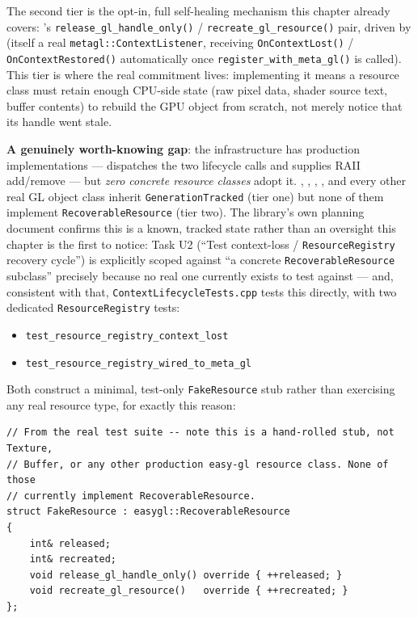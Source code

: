 The second tier is the opt-in, full self-healing mechanism this chapter already covers:
's \texttt{release\_gl\_handle\_only()} / \texttt{recreate\_gl\_resource()}
pair, driven by  (itself a real \texttt{metagl::ContextListener},
receiving \texttt{OnContextLost()} / \texttt{OnContextRestored()} automatically once
\texttt{register\_with\_meta\_gl()} is called). This tier is where the real commitment lives:
implementing it means a resource class must retain enough CPU-side state (raw pixel data, shader
source text, buffer contents) to rebuild the GPU object from scratch, not merely notice that its
handle went stale.

\textbf{A genuinely worth-knowing gap}: the infrastructure has production implementations ---
 dispatches the two lifecycle calls and
 supplies RAII add/remove --- but \emph{zero concrete resource
classes} adopt it. , , ,
, and every other real GL object class inherit \texttt{GenerationTracked}
(tier one) but none of them implement \texttt{RecoverableResource} (tier two). The library's own
planning document confirms this is a known, tracked state rather than an oversight this chapter
is the first to notice: Task U2 (``Test context-loss / \texttt{ResourceRegistry} recovery
cycle'') is explicitly scoped against ``a concrete \texttt{RecoverableResource} subclass''
precisely because no real one currently exists to test against --- and, consistent with that,
\texttt{ContextLifecycleTests.cpp} tests this directly, with two dedicated
\texttt{ResourceRegistry} tests:

\begin{itemize}
  \item \texttt{test\_resource\_registry\_context\_lost}
  \item \texttt{test\_resource\_registry\_wired\_to\_meta\_gl}
\end{itemize}

Both construct a minimal, test-only \texttt{FakeResource} stub rather than exercising any
real resource type, for exactly this reason:

\begin{lstlisting}
// From the real test suite -- note this is a hand-rolled stub, not Texture,
// Buffer, or any other production easy-gl resource class. None of those
// currently implement RecoverableResource.
struct FakeResource : easygl::RecoverableResource
{
    int& released;
    int& recreated;
    void release_gl_handle_only() override { ++released; }
    void recreate_gl_resource()   override { ++recreated; }
};
\end{lstlisting}

